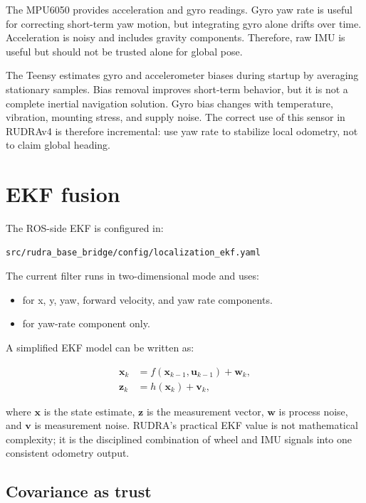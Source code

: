 The MPU6050 provides acceleration and gyro readings. Gyro yaw rate is useful for correcting short-term yaw motion, but integrating gyro alone drifts over time. Acceleration is noisy and includes gravity components. Therefore, raw IMU is useful but should not be trusted alone for global pose.

The Teensy estimates gyro and accelerometer biases during startup by averaging stationary samples. Bias removal improves short-term behavior, but it is not a complete inertial navigation solution. Gyro bias changes with temperature, vibration, mounting stress, and supply noise. The correct use of this sensor in RUDRAv4 is therefore incremental: use yaw rate to stabilize local odometry, not to claim global heading.

\section{EKF fusion}

The ROS-side EKF is configured in:

\begin{lstlisting}[language=bash]
src/rudra_base_bridge/config/localization_ekf.yaml
\end{lstlisting}

The current filter runs in two-dimensional mode and uses:

\begin{itemize}
  \item {} for x, y, yaw, forward velocity, and yaw rate components.
  \item {} for yaw-rate component only.
\end{itemize}

A simplified EKF model can be written as:

\begin{align}
\mathbf{x}_k &= f(\mathbf{x}_{k-1},\mathbf{u}_{k-1}) + \mathbf{w}_k,\\
\mathbf{z}_k &= h(\mathbf{x}_k) + \mathbf{v}_k,
\end{align}

where \(\mathbf{x}\) is the state estimate, \(\mathbf{z}\) is the measurement vector, \(\mathbf{w}\) is process noise, and \(\mathbf{v}\) is measurement noise. RUDRA's practical EKF value is not mathematical complexity; it is the disciplined combination of wheel and IMU signals into one consistent odometry output.

\subsection{Covariance as trust}

